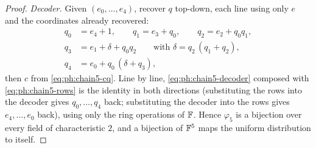 \begin{proof}
\emph{Decoder.}  Given $(e_0,\dots,e_4)$, recover $q$ top-down, each line
using only $e$ and the coordinates already recovered:
\begin{equation}\label{eq:ph:chain5-decoder}
\begin{aligned}
  q_0&=e_4+1,\qquad q_1=e_3+q_0,\qquad q_2=e_2+q_0q_1,\\
  q_3&=e_1+\delta+q_0q_2\qquad\text{with }\delta=q_2\,(q_1+q_2),\\
  q_4&=e_0+q_0\,(\delta+q_3),
\end{aligned}
\end{equation}
then $c$ from \eqref{eq:ph:chain5-cq}.  Line by line,
\eqref{eq:ph:chain5-decoder} composed with \eqref{eq:ph:chain5-rows} is the
identity in both directions (substituting the rows into the decoder gives
$q_0,\dots,q_4$ back; substituting the decoder into the rows gives
$e_4,\dots,e_0$ back), using only the ring operations of $\mathbb{F}$.  Hence
$\varphi_5$ is a bijection over every field of characteristic $2$, and a
bijection of $\mathbb{F}^5$ maps the uniform distribution to itself.
\end{proof}

